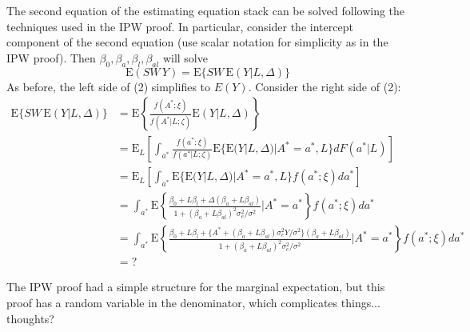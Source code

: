 \documentclass[12pt]{article}
\begin{document}
The second equation of the estimating equation stack can be solved following the techniques used in the IPW proof. In particular, consider the intercept component of the second equation (use scalar notation for simplicity as in the IPW proof). Then $\beta_{0}, \beta_{a}, \beta_{l}, \beta_{al}$ will solve
\begin{equation}
\text{E}( SW \, Y )= \text{E}\{ SW \, \text{E}(Y|L, \Delta) \}
\end{equation}
As before, the left side of (2) simplifies to $E(Y)$. Consider the right side of (2):
\begin{align*}
\text{E} \{ SW \, \text{E}(Y|L, \Delta) \} &= \text{E} \left \{ \frac{f(A^*;\xi)}{f(A^*|L;\zeta)} \text{E}(Y|L, \Delta) \right \} \\
&= \text{E}_L \left [ \int_{a^*} \frac{f(a^*;\xi)}{f(a^*|L;\zeta)} \text{E}\{\text{E}(Y|L, \Delta)|A^*=a^*,L\} dF(a^*|L) \right ]\\
&= \text{E}_L \left [ \int_{a^*}  \text{E}\{\text{E}(Y|L, \Delta)|A^*=a^*,L\} f(a^*;\xi) da^* \right ]\\
&= \int_{a^*} \text{E} \left \{
\frac{\beta_{0} + L \beta_{l} + \Delta (\beta_{a} + L \beta_{al})}{1 + (\beta_{a} + L \beta_{al})^2 \sigma_{e}^2  / \sigma^{2}}
\bigg| A^*=a^* \right \} f(a^*;\xi) da^* \\
&= \int_{a^*} \text{E} \left \{
\frac{\beta_{0} + L \beta_{l} + \{ A^{*} + (\beta_{a} + L \beta_{al}) \sigma^{2}_{e}Y / \sigma^{2} \} (\beta_{a} + L \beta_{al})}{1 + (\beta_{a} + L \beta_{al})^2 \sigma_{e}^2  / \sigma^{2}}
\bigg| A^*=a^* \right \} f(a^*;\xi) da^* \\
&= ?
\end{align*}

The IPW proof had a simple structure for the marginal expectation, but this proof has a random variable in the denominator, which complicates things... thoughts?
\end{document}
